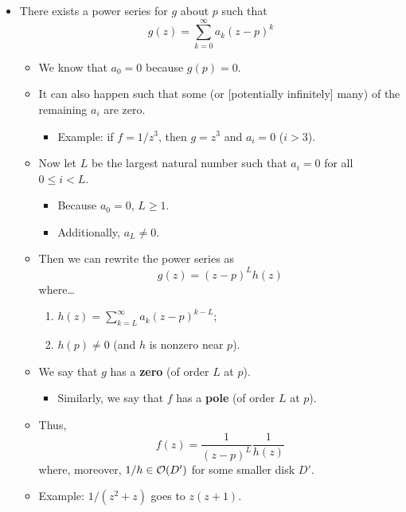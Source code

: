 \documentclass[../notes.tex]{subfiles}
\begin{document}
\begin{itemize}
\begin{itemize}
    \end{itemize}
    \item There exists a power series for $g$ about $p$ such that
    \begin{equation*}
        g(z) = \sum_{k=0}^\infty a_k(z-p)^k
    \end{equation*}
    \begin{itemize}
        \item We know that $a_0=0$ because $g(p)=0$.
        \item It can also happen such that some (or [potentially infinitely] many) of the remaining $a_i$ are zero.
        \begin{itemize}
            \item Example: if $f=1/z^3$, then $g=z^3$ and $a_i=0$ ($i>3$).
        \end{itemize}
        \item Now let $L$ be the largest natural number such that $a_i=0$ for all $0\leq i<L$.
        \begin{itemize}
            \item Because $a_0=0$, $L\geq 1$.
            \item Additionally, $a_L\neq 0$.
        \end{itemize}
        \item Then we can rewrite the power series as
        \begin{equation*}
            g(z) = (z-p)^Lh(z)
        \end{equation*}
        where\dots
        \begin{enumerate}
            \item $h(z)=\sum_{k=L}^\infty a_k(z-p)^{k-L}$;
            \item $h(p)\neq 0$ (and $h$ is nonzero near $p$).
        \end{enumerate}
        \item We say that $g$ has a \textbf{zero} (of order $L$ at $p$).
        \begin{itemize}
            \item Similarly, we say that $f$ has a \textbf{pole} (of order $L$ at $p$).
        \end{itemize}
        \item Thus,
        \begin{equation*}
            f(z) = \frac{1}{(z-p)^L}\frac{1}{h(z)}
        \end{equation*}
        where, moreover, $1/h\in\mathcal{O}(D')$ for some smaller disk $D'$.
        \item Example: $1/(z^2+z)$ goes to $z(z+1)$.

\end{itemize}
\end{itemize}
\end{document}
